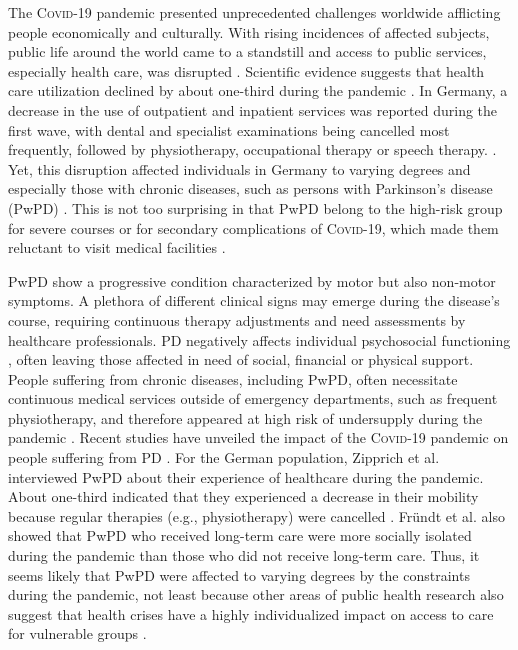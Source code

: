 \documentclass[a4paper,oneside,11pt,english]{scrartcl}
\begin{document}
The \textsc{Covid}-19 pandemic presented unprecedented challenges worldwide afflicting people economically and culturally. With rising incidences of affected subjects, public life around the world came to a standstill and access to public services, especially health care, was disrupted \cite{nunez2021access, moynihan2021impact, world2020impact}. Scientific evidence suggests that health care utilization declined by about one-third during the pandemic \cite{moynihan2021impact}. In Germany, a decrease in the use of outpatient and inpatient services was reported during the first wave, with dental and specialist examinations being cancelled most frequently, followed by physiotherapy, occupational therapy or speech therapy. \cite{Heidemann2022Non-utilisation}. Yet, this disruption affected individuals in Germany to varying degrees and especially those with chronic diseases, such as persons with Parkinson's disease (Pw\textsc{PD}) \cite{kasar2021life,yogev2021covid,scheidt2021care, sepulveda2020impact}. This is not too surprising in that Pw\textsc{PD} belong to the high-risk group for severe courses or for secondary complications of \textsc{Covid}-19, which made them reluctant to visit medical facilities \cite{feral2020collateral}. 

Pw\textsc{PD} show a progressive condition characterized by motor but also non-motor symptoms. A plethora of different clinical signs may emerge during the disease's course, requiring continuous therapy adjustments and need assessments by healthcare professionals. \textsc{PD} negatively affects individual psychosocial functioning \cite{demirtepe2022psychosocial}, often leaving those affected in need of social, financial or physical support. People suffering from chronic diseases, including Pw\textsc{PD}, often necessitate continuous medical services outside of emergency departments, such as frequent physiotherapy, and therefore appeared at high risk of undersupply during the pandemic \cite{scheidt2021care, nunez2021access, world2020impact}. Recent studies have unveiled the impact of the \textsc{Covid}-19 pandemic on people suffering from \textsc{PD} \cite{yogev2021covid, zipprich2020knowledge, frundt2022impact, richter2021analysis, brooks2021social}. For the German population, Zipprich et al. interviewed Pw\textsc{PD} about their experience of healthcare during the pandemic. About one-third indicated that they experienced a decrease in their mobility because regular therapies (e.g., physiotherapy) were cancelled \cite{zipprich2020knowledge}. Fründt et al. also showed that Pw\textsc{PD} who received long-term care were more socially isolated during the pandemic than those who did not receive long-term care. Thus, it seems likely that Pw\textsc{PD} were affected to varying degrees by the constraints during the pandemic, not least because other areas of public health research also suggest that health crises have a highly individualized impact on access to care for vulnerable groups \cite{huijts2017prevalence, lowcock2012social, whocovidbrief}.
\end{document}
